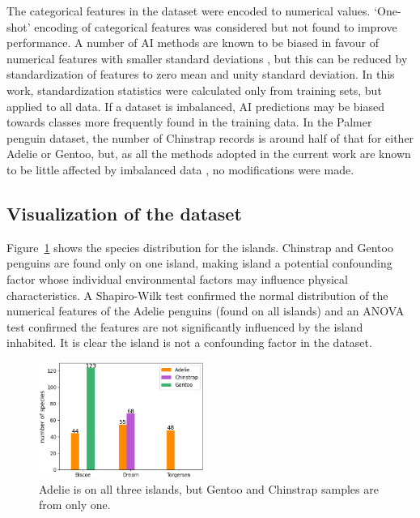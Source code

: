 \documentclass[12pt]{article}
\begin{document}
The categorical features in the dataset were encoded to numerical values. `One-shot' encoding of 
categorical features was considered but not found to 
improve performance. A number of AI methods are known to be biased in favour of numerical features 
with smaller standard deviations \cite{hastie2009elements}, but this can be reduced by standardization 
of features to zero mean and unity standard deviation. In this work, 
standardization statistics were calculated only from training sets, but applied to all data. 
If a dataset is imbalanced, 
AI predictions may be biased towards classes more frequently found in the training data. 
In the Palmer penguin dataset, the number of Chinstrap records is around half of that for either Adelie or Gentoo, 
but, as all the methods adopted in the current work are known to be little affected by 
imbalanced data \cite{he2009learning}, no modifications were made.

\subsection*{Visualization of the dataset}

Figure~\ref{fig:islands} shows the species distribution for the islands. 
Chinstrap and Gentoo penguins are found only on one island, making island a potential confounding factor whose 
individual environmental factors may influence physical characteristics. 
A Shapiro-Wilk test confirmed the normal distribution of the numerical features of the Adelie penguins (found on 
all islands) and an ANOVA test confirmed the features are not significantly influenced by the island inhabited. 
It is clear the island is not a confounding factor in the dataset.

\begin{figure} %
  \centering
  \vspace{-2\baselineskip} %
  \includegraphics[width=0.48\textwidth]{islands.png} %
  \vspace{-0.5\baselineskip} %
  \caption{\centering\linespread{0.8}\selectfont Adelie is on all three islands, but Gentoo and Chinstrap samples are from only one.}
  \vspace{-0.5\baselineskip} %
  \label{fig:islands}
\end{figure}
\end{document}
